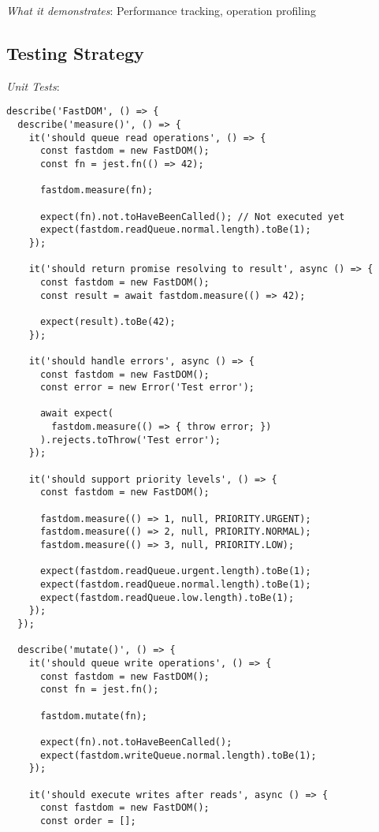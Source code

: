 \documentclass[11pt]{article}
\begin{document}
\emph{What it demonstrates}: Performance tracking, operation profiling
\subsection{Testing Strategy}
\label{sec:org9ef77c4}

\emph{Unit Tests}:

\begin{verbatim}
describe('FastDOM', () => {
  describe('measure()', () => {
    it('should queue read operations', () => {
      const fastdom = new FastDOM();
      const fn = jest.fn(() => 42);
      
      fastdom.measure(fn);
      
      expect(fn).not.toHaveBeenCalled(); // Not executed yet
      expect(fastdom.readQueue.normal.length).toBe(1);
    });
    
    it('should return promise resolving to result', async () => {
      const fastdom = new FastDOM();
      const result = await fastdom.measure(() => 42);
      
      expect(result).toBe(42);
    });
    
    it('should handle errors', async () => {
      const fastdom = new FastDOM();
      const error = new Error('Test error');
      
      await expect(
        fastdom.measure(() => { throw error; })
      ).rejects.toThrow('Test error');
    });
    
    it('should support priority levels', () => {
      const fastdom = new FastDOM();
      
      fastdom.measure(() => 1, null, PRIORITY.URGENT);
      fastdom.measure(() => 2, null, PRIORITY.NORMAL);
      fastdom.measure(() => 3, null, PRIORITY.LOW);
      
      expect(fastdom.readQueue.urgent.length).toBe(1);
      expect(fastdom.readQueue.normal.length).toBe(1);
      expect(fastdom.readQueue.low.length).toBe(1);
    });
  });
  
  describe('mutate()', () => {
    it('should queue write operations', () => {
      const fastdom = new FastDOM();
      const fn = jest.fn();
      
      fastdom.mutate(fn);
      
      expect(fn).not.toHaveBeenCalled();
      expect(fastdom.writeQueue.normal.length).toBe(1);
    });
    
    it('should execute writes after reads', async () => {
      const fastdom = new FastDOM();
      const order = [];
      

\end{verbatim}
\end{document}
